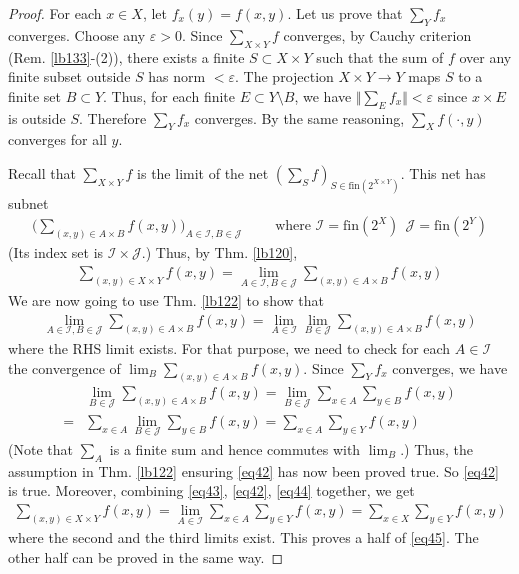\documentclass[12pt,b5paper,notitlepage]{article}
\theoremstyle{definition}
\theoremstyle{plain}
\newcommand{\mc}{\mathcal}
\newcommand{\fin}{\mathrm{fin}}
\newcommand{\eps}{\varepsilon}
\numberwithin{equation}{section}
\begin{document}
\begin{proof}
For each $x\in X$, let $f_x(y)=f(x,y)$. Let us prove that $\sum_Y f_x$ converges.
Choose any $\eps>0$. Since $\sum_{X\times Y}f$ converges, by Cauchy criterion (Rem. \ref{lb133}-(2)), there exists a finite $S\subset X\times Y$ such that the sum of $f$ over any finite subset outside $S$ has norm $<\eps$. The projection $X\times Y\rightarrow Y$ maps $S$ to a finite set $B\subset Y$. Thus, for each finite $E\subset Y\setminus B$, we have $\Vert\sum_E f_x\Vert<\eps$ since $x\times E$ is outside $S$. Therefore $\sum_Y f_x$ converges. By the same reasoning, $\sum_Xf(\cdot,y)$ converges for all $y$.

Recall that $\sum_{X\times Y}f$ is the limit of the net $(\sum_S f)_{S\in\fin(2^{X\times Y})}$. This net has subnet
\begin{align*}
\Big(\sum_{(x,y)\in A\times B} f(x,y)\Big)_{A\in \mc I,B\in \mc J}\qquad \text{ where }\mc I=\fin(2^X)~~\mc J=\fin(2^Y)
\end{align*}
(Its index set is $\mc I\times\mc J$.) Thus, by Thm. \ref{lb120},
\begin{align}
\sum_{(x,y)\in X\times Y}f(x,y)=\lim_{A\in\mc I,B\in\mc J} \sum_{(x,y)\in A\times B} f(x,y) \label{eq43}
\end{align}
We are now going to use Thm. \ref{lb122} to show that
\begin{align}
\lim_{A\in\mc I,B\in\mc J} \sum_{(x,y)\in A\times B} f(x,y)=\lim_{A\in\mc I}\lim_{B\in\mc J} \sum_{(x,y)\in A\times B} f(x,y) \label{eq42}
\end{align}
where the RHS limit exists. For that purpose, we need to check for each $A\in\mc I$ the convergence of $\lim_B\sum_{(x,y)\in A\times B}f(x,y)$. Since $\sum_Yf_x$ converges, we have
\begin{align}
&\lim_{B\in\mc J}\sum_{(x,y)\in A\times B}f(x,y)=\lim_{B\in\mc J}\sum_{x\in A}\sum_{y\in B}f(x,y)\nonumber\\
=&\sum_{x\in A}\lim_{B\in\mc J}\sum_{y\in B}f(x,y)=\sum_{x\in A}\sum_{y\in Y}f(x,y)\label{eq44}
\end{align}
(Note that $\sum_A$ is a finite sum and hence commutes with $\lim_B$.) Thus, the assumption in Thm. \ref{lb122} ensuring \eqref{eq42} has now been proved true. So \eqref{eq42} is true. Moreover, combining \eqref{eq43}, \eqref{eq42}, \eqref{eq44}  together, we get
\begin{align*}
\sum_{(x,y)\in X\times Y}f(x,y)=\lim_{A\in\mc I}\sum_{x\in A}\sum_{y\in Y}f(x,y)=\sum_{x\in X}\sum_{y\in Y}f(x,y)
\end{align*}
where the second and the third limits exist. This proves a half of \eqref{eq45}. The other half can be proved in the same way.
\end{proof}
\end{document}
